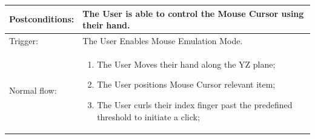 \documentclass[12pt,a4paper,oneside]{book}
\theoremstyle{plain}
\numberwithin{equation}{chapter}
\begin{document}
\begin{longtable}{| p{3cm} | p{12cm} |}
\hline
Postconditions: & The User is able to control the Mouse Cursor using their hand.\\
\hline
Trigger: & The User Enables Mouse Emulation Mode.\\
\hline
Normal flow: &\mbox{}\par\vspace{-\baselineskip}
\begin{enumerate}
\item The User Moves their hand along the YZ plane;
\item The User positions Mouse Cursor relevant item;
\item The User curls their index finger past the predefined threshold to initiate a click;
\end{enumerate}\\

\end{longtable}
\end{document}
